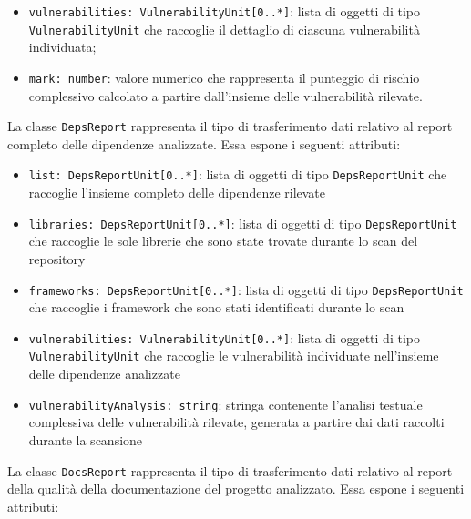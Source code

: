 \documentclass[a4paper, 11pt]{article}
\newcounter{subsubsubsection}[subsubsection]
\begin{document}
\begin{itemize}
  \item \texttt{vulnerabilities: VulnerabilityUnit[0..*]}: lista di oggetti di tipo
    \texttt{VulnerabilityUnit} che raccoglie il dettaglio di ciascuna vulnerabilità individuata;
 
  \item \texttt{mark: number}: valore numerico che rappresenta il punteggio di rischio complessivo
    calcolato a partire dall'insieme delle vulnerabilità rilevate.
\end{itemize}
 
\label{sec:DepsReport}
 
La classe \texttt{DepsReport} rappresenta il tipo di trasferimento dati relativo al report completo delle
dipendenze analizzate. Essa espone i seguenti attributi:
 
\begin{itemize}
  \item \texttt{list: DepsReportUnit[0..*]}: lista di oggetti di tipo \texttt{DepsReportUnit}
    che raccoglie l'insieme completo delle dipendenze rilevate
 
  \item \texttt{libraries: DepsReportUnit[0..*]}: lista di oggetti di tipo \texttt{DepsReportUnit}
    che raccoglie le sole librerie che sono state trovate durante lo scan del repository
 
  \item \texttt{frameworks: DepsReportUnit[0..*]}: lista di oggetti di tipo \texttt{DepsReportUnit}
    che raccoglie i framework che sono stati identificati durante lo scan
 
  \item \texttt{vulnerabilities: VulnerabilityUnit[0..*]}: lista di oggetti di tipo
    \texttt{VulnerabilityUnit} che raccoglie le vulnerabilità individuate nell'insieme delle
    dipendenze analizzate
 
  \item \texttt{vulnerabilityAnalysis: string}: stringa contenente l'analisi testuale complessiva
    delle vulnerabilità rilevate, generata a partire dai dati raccolti durante la scansione
\end{itemize}




\label{sec:DocsReport}
 
La classe \texttt{DocsReport} rappresenta il tipo di trasferimento dati relativo al report della
qualità della documentazione del progetto analizzato. Essa espone i seguenti attributi:
 
\end{document}
